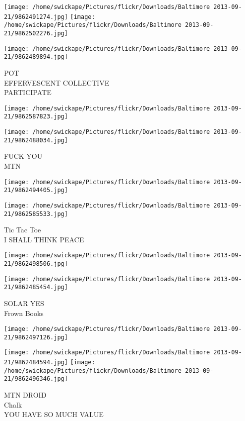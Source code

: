\documentclass[10pt,letterpaper]{article}
\begin{document}
\texttt{[image: /home/swickape/Pictures/flickr/Downloads/Baltimore 2013-09-21/9862491274.jpg]}
\texttt{[image: /home/swickape/Pictures/flickr/Downloads/Baltimore 2013-09-21/9862502276.jpg]}

\texttt{[image: /home/swickape/Pictures/flickr/Downloads/Baltimore 2013-09-21/9862489894.jpg]}

POT\\
EFFERVESCENT COLLECTIVE\\
PARTICIPATE
\pagebreak

\texttt{[image: /home/swickape/Pictures/flickr/Downloads/Baltimore 2013-09-21/9862587823.jpg]}

\vspace{0.25in}
\texttt{[image: /home/swickape/Pictures/flickr/Downloads/Baltimore 2013-09-21/9862488034.jpg]}

FUCK YOU\\
MTN
\pagebreak

\texttt{[image: /home/swickape/Pictures/flickr/Downloads/Baltimore 2013-09-21/9862494405.jpg]}

\vspace{0.25in}
\texttt{[image: /home/swickape/Pictures/flickr/Downloads/Baltimore 2013-09-21/9862585533.jpg]}

Tic Tac Toe\\
I SHALL THINK PEACE
\pagebreak

\texttt{[image: /home/swickape/Pictures/flickr/Downloads/Baltimore 2013-09-21/9862498506.jpg]}

\vspace{0.25in}
\texttt{[image: /home/swickape/Pictures/flickr/Downloads/Baltimore 2013-09-21/9862485454.jpg]}

SOLAR YES\\
Frown Books
\pagebreak

\texttt{[image: /home/swickape/Pictures/flickr/Downloads/Baltimore 2013-09-21/9862497126.jpg]}

\vspace{0.25in}
\texttt{[image: /home/swickape/Pictures/flickr/Downloads/Baltimore 2013-09-21/9862484594.jpg]}
\texttt{[image: /home/swickape/Pictures/flickr/Downloads/Baltimore 2013-09-21/9862496346.jpg]}

MTN DROID\\
Chalk\\
YOU HAVE SO MUCH VALUE
\pagebreak
\end{document}
